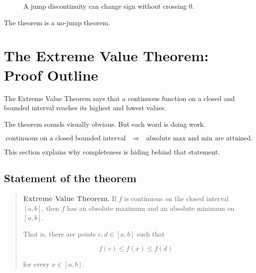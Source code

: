 \begin{figure}[h]
\centering
{}
\caption{A jump discontinuity can change sign without crossing \(0\).}
\label{fig:bolzano-fails-jump}
\end{figure}

The theorem is a no-jump theorem.

\section{The Extreme Value Theorem: Proof Outline}
\label{appsec:evt-proof-outline}

The Extreme Value Theorem says that a continuous function on a closed and bounded
interval reaches its highest and lowest values.

The theorem sounds visually obvious.  But each word is doing work.

\[
\boxed{
\text{continuous on a closed bounded interval}
\quad\Longrightarrow\quad
\text{absolute max and min are attained.}
}
\]

This section explains why completeness is hiding behind that statement.

\subsection{Statement of the theorem}
\label{appsubsec:evt-statement}

\begin{quote}
\textbf{Extreme Value Theorem.}
If \(f\) is continuous on the closed interval \([a,b]\), then \(f\) has an absolute maximum
and an absolute minimum on \([a,b]\).

That is, there are points \(c,d\in[a,b]\) such that

\[
f(c)\le f(x)\le f(d)
\]

for every \(x\in[a,b]\).
\end{quote}

